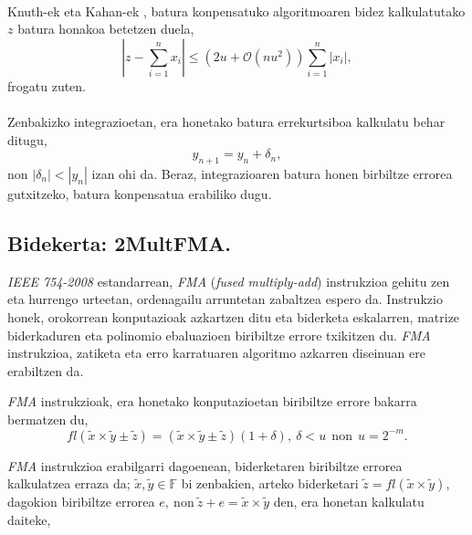 \paragraph*{}Knuth-ek eta Kahan-ek \cite{Muller2009},  batura konpensatuko algoritmoaren bidez kalkulatutako $z$ batura honakoa betetzen duela, 
\begin{equation*}
\left | z - \sum_{i=1}^{n} x_i \right | \leq (2u+ \mathcal{O}(nu^2)) \sum_{i=1}^{n} |x_i|,
\end{equation*}
frogatu zuten.

\paragraph*{} Zenbakizko integrazioetan, era honetako batura errekurtsiboa kalkulatu behar ditugu,
\begin{equation*}
y_{n+1}=y_n+\delta_n,
\end{equation*}  
non $|\delta_n|<|y_n|$ izan ohi da. Beraz, integrazioaren batura honen birbiltze errorea gutxitzeko, batura konpensatua erabiliko dugu.  

\subsection*{Bidekerta: 2MultFMA.}

\emph{IEEE 754-2008} estandarrean, \emph{FMA} (\emph{fused multiply-add}) instrukzioa gehitu zen eta hurrengo urteetan, ordenagailu arruntetan zabaltzea espero da. Instrukzio honek, orokorrean konputazioak azkartzen ditu eta biderketa eskalarren, matrize biderkaduren eta polinomio ebaluazioen biribiltze errore txikitzen du. \emph{FMA} instrukzioa, zatiketa eta erro karratuaren algoritmo azkarren diseinuan ere erabiltzen da.


\emph{FMA} instrukzioak, era honetako konputazioetan biribiltze errore bakarra bermatzen du,
\begin{equation*}
fl(\tilde x \times \tilde y \pm \tilde z)= (\tilde x \times \tilde y\pm \tilde z) (1+\delta), \ \delta<u \ \ \text{non} \ \ u=2^{-m}.
\end{equation*}
 

\emph{FMA}  instrukzioa erabilgarri dagoenean, biderketaren biribiltze errorea kalkulatzea erraza da; $\tilde x,\tilde y \in \mathbb{F}$ bi zenbakien, arteko biderketari $\tilde z= fl(\tilde x \times \tilde y)$,  dagokion biribiltze errorea $e, \ \text{non} \  \tilde{z}+ e=\tilde x \times \tilde y$ den, era honetan kalkulatu daiteke,

